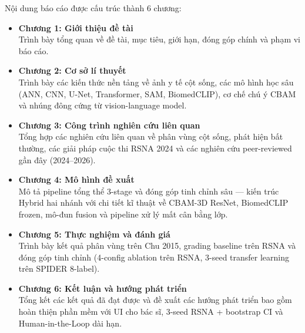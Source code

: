 \documentclass[12pt]{report}
\begin{document}
Nội dung báo cáo được cấu trúc thành 6 chương:
\begin{itemize}
    \item \textbf{Chương 1: Giới thiệu đề tài}\\
    Trình bày tổng quan về đề tài, mục tiêu, giới hạn, đóng góp chính và phạm vi báo cáo.
    \item \textbf{Chương 2: Cơ sở lí thuyết}\\
    Trình bày các kiến thức nền tảng về ảnh y tế cột sống, các mô hình học sâu (ANN, CNN, U-Net, Transformer, SAM, BiomedCLIP), cơ chế chú ý CBAM và nhúng đông cứng từ vision-language model.
    \item \textbf{Chương 3: Công trình nghiên cứu liên quan}\\
    Tổng hợp các nghiên cứu liên quan về phân vùng cột sống, phát hiện bất thường, các giải pháp cuộc thi RSNA 2024 và các nghiên cứu peer-reviewed gần đây (2024--2026).
    \item \textbf{Chương 4: Mô hình đề xuất}\\
    Mô tả pipeline tổng thể 3-stage và đóng góp tinh chỉnh sâu --- kiến trúc Hybrid hai nhánh với chi tiết kĩ thuật về CBAM-3D ResNet, BiomedCLIP frozen, mô-đun fusion và pipeline xử lý mất cân bằng lớp.
    \item \textbf{Chương 5: Thực nghiệm và đánh giá}\\
    Trình bày kết quả phân vùng trên Chu 2015, grading baseline trên RSNA và đóng góp tinh chỉnh (4-config ablation trên RSNA, 3-seed transfer learning trên SPIDER 8-label).
    \item \textbf{Chương 6: Kết luận và hướng phát triển}\\
    Tổng kết các kết quả đã đạt được và đề xuất các hướng phát triển bao gồm hoàn thiện phần mềm với UI cho bác sĩ, 3-seed RSNA + bootstrap CI và Human-in-the-Loop dài hạn.
\end{itemize}

    
\afterpreface


\clearpage


\clearpage


\clearpage


\clearpage


\clearpage


\clearpage

% 

\renewcommand{\bibname}{Tài liệu tham khảo}



\appendix

\end{document}
